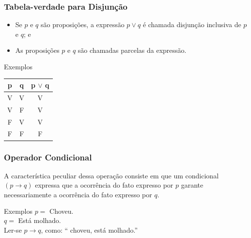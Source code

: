 \documentclass[aspectratio=169]{beamer} %
\begin{document}
\begin{frame}
\frametitle{Tabela-verdade para Disjunção}

\begin{itemize}
\item Se $p$ e $q$ são proposições, a expressão $p \vee q$ é chamada disjunção inclusiva de $p$ e $q$; e
\item As proposições $p$ e $q$ são chamadas parcelas da expressão.
\end{itemize} \vfill

\begin{exampleblock}{Exemplos}
\center
\begin{tabular}{|c|c|c|}
	\hline
	\textbf{p} & \textbf{q} & \textbf{p $\vee$ q}\\ \hline
	V & V & V \\ \hline
	V & F & V \\ \hline
	F & V & V \\ \hline
	F & F & F \\ \hline
\end{tabular}
\end{exampleblock}
\end{frame}

\begin{frame}
\frametitle{Operador Condicional}

A característica peculiar dessa operação consiste em que um condicional $(p \rightarrow q)$ expressa que a ocorrência do fato expresso por $p$ garante necessariamente a ocorrência do fato expresso por $q$. \vfill

\begin{exampleblock}{Exemplos}
$p =$ Choveu.\\
$q =$ Está molhado.\\
Ler-se $p \rightarrow q$, como: `` choveu,  está molhado.''
\end{exampleblock}
\end{frame}
\end{document}
